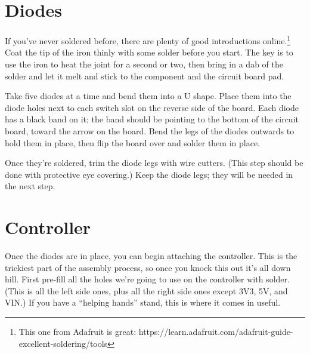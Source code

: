 \documentclass{article}
\begin{document}
\section{Diodes}

If you've never soldered before, there are plenty of good
introductions online.\footnote{This one from Adafruit is great:
  https://learn.adafruit.com/adafruit-guide-excellent-soldering/tools}
Coat the tip of the iron thinly with some solder before you start. The
key is to use the iron to heat the joint for a second or two, then
bring in a dab of the solder and let it melt and stick to the
component and the circuit board pad.

\vspace{1em}

Take five diodes at a time and bend them into a U shape. Place them
into the diode holes next to each switch slot on the reverse side of
the board. Each diode has a black band on it; the band should be
pointing to the bottom of the circuit board, toward the arrow on the
board. Bend the legs of the diodes outwards to hold them in place,
then flip the board over and solder them in place.

\vspace{1em}
\noindent{}
\vspace{1em}

Once they're soldered, trim the diode legs with wire
cutters. (This step should be done with protective eye covering.) Keep
the diode legs; they will be needed in the next step.

\section{Controller}

Once the diodes are in place, you can begin attaching the
controller. This is the trickiest part of the assembly process, so
once you knock this out it's all down hill. First pre-fill all the
holes we're going to use on the controller with solder. (This is all
the left side ones, plus all the right side ones except 3V3, 5V, and
VIN.) If you have a ``helping hands'' stand, this is where it comes in
useful.
\end{document}
